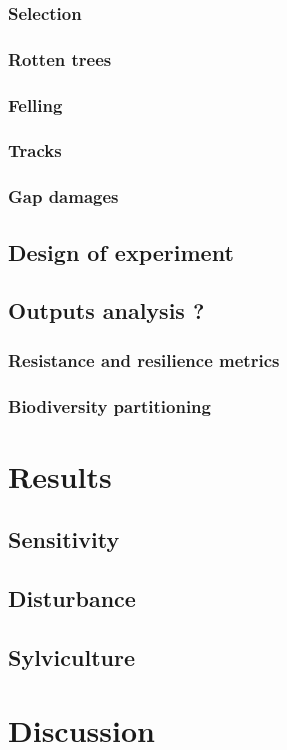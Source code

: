\documentclass[]{article}
\theoremstyle{definition}
\theoremstyle{definition}
\theoremstyle{remark}
\begin{document}
\subsubsection{Selection}\label{selection}

\subsubsection{Rotten trees}\label{rotten-trees}

\subsubsection{Felling}\label{felling}

\subsubsection{Tracks}\label{tracks}

\subsubsection{Gap damages}\label{gap-damages}

\subsection{Design of experiment}\label{design-of-experiment-1}

\subsection{Outputs analysis ?}\label{outputs-analysis}

\subsubsection{Resistance and resilience
metrics}\label{resistance-and-resilience-metrics-1}

\subsubsection{Biodiversity
partitioning}\label{biodiversity-partitioning-1}

\section{Results}\label{results}

\subsection{Sensitivity}\label{sensitivity}

\subsection{Disturbance}\label{disturbance-1}

\subsection{Sylviculture}\label{sylviculture}

\section{Discussion}\label{discussion}


\end{document}
